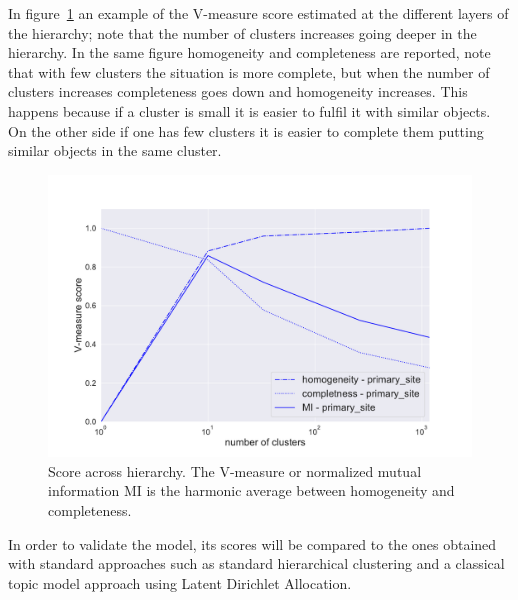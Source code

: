In figure~\ref{fig:topic/metric_scores_primarysite} an example of the V-measure score estimated at the different layers of the hierarchy; note that the number of clusters increases going deeper in the hierarchy. In the same figure homogeneity and completeness are reported, note that with few clusters the situation is more complete, but when the number of clusters increases completeness goes down and homogeneity increases. This happens because if a cluster is small it is easier to fulfil it with similar objects. On the other side if one has few clusters it is easier to complete them putting similar objects in the same cluster.
\begin{figure}[htb!]
    \centering
    \includegraphics[width=0.8\linewidth]{pictures/topic/gtex/oversigma_10tissue/metric_scores_primarysite.pdf}
    \caption{Score across hierarchy. The V-measure or normalized mutual information MI is the harmonic average between homogeneity and completeness.}
    \label{fig:topic/metric_scores_primarysite}
\end{figure}

In order to validate the model, its scores will be compared to the ones obtained with standard approaches such as standard hierarchical clustering and a classical topic model approach using Latent Dirichlet Allocation. 
\FloatBarrier